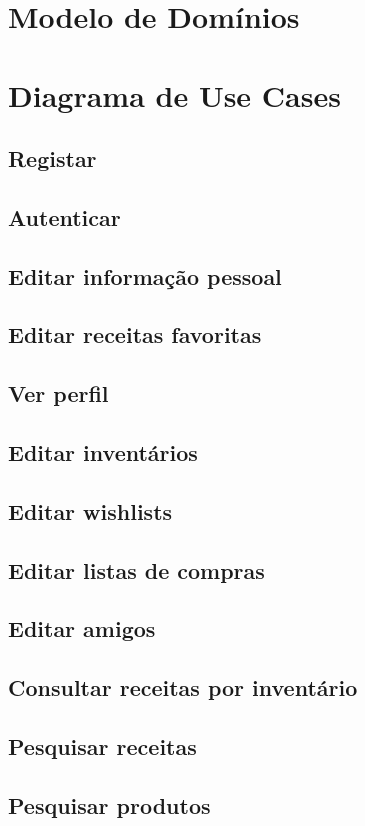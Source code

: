 \documentclass[a4paper]{report}
\begin{document}
\chapter{Modelo de Domínios}

\chapter{Diagrama de Use Cases}
    \section{Registar}
    \section{Autenticar}
    \section{Editar informação pessoal}
    \section{Editar receitas favoritas}
    \section{Ver perfil}
    \section{Editar inventários}
    \section{Editar wishlists}
    \section{Editar listas de compras}
    \section{Editar amigos}
    \section{Consultar receitas por inventário}
    \section{Pesquisar receitas}
    \section{Pesquisar produtos}
\end{document}

